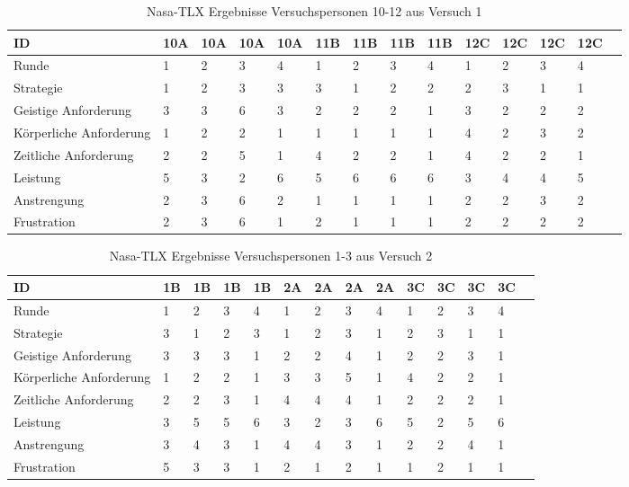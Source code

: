 \documentclass[12pt,a4paper]{scrartcl}
\begin{document}
\begin{appendix}
\begin{table}
\bigskip\bigskip  %
\caption{Nasa-TLX Ergebnisse Versuchspersonen 10-12 aus Versuch 1}

\smallskip
\begin{tabular}{|p{6cm}| p{0.8cm} | p{0.8cm} | p{0.8cm} | p{0.8cm} || p{0.8cm} | p{0.8cm} | p{0.8cm} | p{0.8cm} || p{0.8cm} | p{0.8cm} | p{0.8cm} | p{0.8cm} | p{} | }
\hline
ID & 10A & 10A & 10A & 10A & 11B & 11B & 11B & 11B & 12C & 12C & 12C & 12C \\ \hline \hline
Runde & 1 & 2 & 3 & 4 & 1 & 2 & 3 & 4 & 1 & 2 & 3 & 4 \\ \hline
	Strategie & 1 & 2 & 3 & 3 & 3 & 1 & 2 & 2 & 2 & 3 & 1 & 1 \\ \hline \hline
	Geistige Anforderung & 3 & 3 & 6 & 3 & 2 & 2 & 2 & 1 & 3 & 2 & 2 & 2 \\ \hline
	Körperliche Anforderung & 1 & 2 & 2 & 1 & 1 & 1 & 1 & 1 & 4 & 2 & 3 & 2 \\ \hline
	Zeitliche Anforderung & 2 & 2 & 5 & 1 & 4 & 2 & 2 & 1 & 4 & 2 & 2 & 1 \\ \hline
	Leistung & 5 & 3 & 2 & 6 & 5 & 6 & 6 & 6 & 3 & 4 & 4 & 5 \\ \hline
	Anstrengung & 2 & 3 & 6 & 2 & 1 & 1 & 1 & 1 & 2 & 2 & 3 & 2 \\ \hline
	Frustration & 2 & 3 & 6 & 1 & 2 & 1 & 1 & 1 & 2 & 2 & 2 & 2 \\ \hline
\end{tabular}
\end{table}


\begin{table}
\caption{Nasa-TLX Ergebnisse Versuchspersonen 1-3 aus Versuch 2}

\smallskip
\begin{tabular}{|p{6cm}| p{0.8cm} | p{0.8cm} | p{0.8cm} | p{0.8cm} || p{0.8cm} | p{0.8cm} | p{0.8cm} | p{0.8cm} || p{0.8cm} | p{0.8cm} | p{0.8cm} | p{0.8cm} | p{} | }
\hline
ID & 1B & 1B & 1B & 1B & 2A & 2A & 2A & 2A & 3C & 3C & 3C & 3C \\ \hline \hline
Runde & 1 & 2 & 3 & 4 & 1 & 2 & 3 & 4 & 1 & 2 & 3 & 4 \\ \hline
	Strategie & 3 & 1 & 2 & 3 & 1 & 2 & 3 & 1 & 2 & 3 & 1 & 1 \\ \hline \hline
	Geistige Anforderung & 3 & 3 & 3 & 1 & 2 & 2 & 4 & 1 & 2 & 2 & 3 & 1 \\ \hline
	Körperliche Anforderung & 1 & 2 & 2 & 1 & 3 & 3 & 5 & 1 & 4 & 2 & 2 & 1 \\ \hline
	Zeitliche Anforderung & 2 & 2 & 3 & 1 & 4 & 4 & 4 & 1 & 2 & 2 & 2 & 1 \\ \hline
	Leistung & 3 & 5 & 5 & 6 & 3 & 2 & 3 & 6 & 5 & 2 & 5 & 6 \\ \hline
	Anstrengung & 3 & 4 & 3 & 1 & 4 & 4 & 3 & 1 & 2 & 2 & 4 & 1 \\ \hline
	Frustration & 5 & 3 & 3 & 1 & 2 & 1 & 2 & 1 & 1 & 2 & 1 & 1 \\ \hline
\end{tabular}


\end{table}
\end{appendix}
\end{document}
